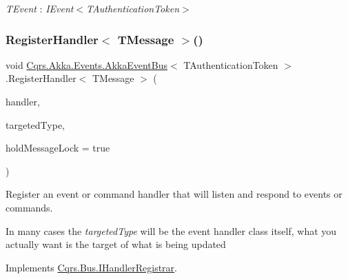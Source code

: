 \begin{Desc}
\item[Type Constraints]\begin{description}
\item[{\em T\+Event} : {\em I\+Event$<$T\+Authentication\+Token$>$}]\end{description}
\end{Desc}
\mbox{\label{classCqrs_1_1Akka_1_1Events_1_1AkkaEventBus_a59ec3e497e511b73b5239eee80691443_a59ec3e497e511b73b5239eee80691443}} 
\subsubsection{\texorpdfstring{Register\+Handler$<$ T\+Message $>$()}{RegisterHandler< TMessage >()}\hspace{0.1cm}{\footnotesize\ttfamily [1/2]}}
{\footnotesize\ttfamily void \hyperlink{classCqrs_1_1Akka_1_1Events_1_1AkkaEventBus}{Cqrs.\+Akka.\+Events.\+Akka\+Event\+Bus}$<$ T\+Authentication\+Token $>$.Register\+Handler$<$ T\+Message $>$ (\begin{DoxyParamCaption}\item[{Action$<$ T\+Message $>$}]{handler,  }\item[{Type}]{targeted\+Type,  }\item[{bool}]{hold\+Message\+Lock = {\ttfamily true} }\end{DoxyParamCaption})}



Register an event or command handler that will listen and respond to events or commands. 

In many cases the {\itshape targeted\+Type}  will be the event handler class itself, what you actually want is the target of what is being updated 

Implements \hyperlink{interfaceCqrs_1_1Bus_1_1IHandlerRegistrar_ab6ca4dfdc54a5aeebe4651dbdb479f55_ab6ca4dfdc54a5aeebe4651dbdb479f55}{Cqrs.\+Bus.\+I\+Handler\+Registrar}.

